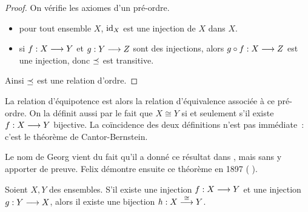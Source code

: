 \begin{proof}
  On vérifie les axiomes d'un pré-ordre.
  \begin{itemize}
  \item pour tout ensemble $X$, $\operatorname{id}_X$ est une injection de $X$ dans $X$.
  \item si $f : \displaystyle X \longrightarrow Y$ et $g : \displaystyle Y \longrightarrow Z$ sont des
    injections, alors $g\circ f : \displaystyle X \longrightarrow Z$ est une injection, donc
    $\preceq$ est transitive.
  \end{itemize}
  Ainsi $\preceq$ est une relation d'ordre.
\end{proof}

La relation d'équipotence est alors la relation d'équivalence associée à ce
pré-ordre. On la définit aussi par le fait que $X\cong Y$ si et seulement s'il
existe $f : \displaystyle X \longrightarrow Y$ bijective. La coïncidence des deux définitions
n'est pas immédiate~: c'est le théorème de Cantor-Bernstein.

Le nom de Georg  vient du fait qu'il a donné ce résultat dans 
\cite{Cantor1887}, mais sans y apporter de preuve. Felix 
démontre ensuite ce théorème en 1897
( \cite{Borel1898}).

\begin{theorem}
  Soient $X,Y$ des ensembles. S'il existe une injection
  $f : \displaystyle X \longrightarrow Y$ et une injection $g : \displaystyle Y \longrightarrow X$, alors il
  existe une bijection $h : \displaystyle X \overset{\cong}{\longrightarrow} Y$.
\end{theorem}

